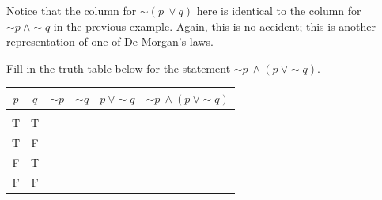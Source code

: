 Notice that the column for $\sim (p\ \vee q)$ here is identical to the column for $\sim p\ \wedge \sim q$ in the previous example.  Again, this is no accident; this is another representation of one of De Morgan's laws.

\begin{try}
Fill in the truth table below for the statement $\sim p\ \wedge (p\ \vee \sim q)$.
\begin{center}
\begin{tabular}{|c c c c c c|}
\hline
$p$ & $q$ & $\sim p$ & $\sim q$ & $p\ \vee \sim q$ & $\sim p\ \wedge (p\ \vee \sim q)$\\
\hline
& & & & &\\
T & T & & & &\\
T & F & & & &\\
F & T & & & &\\
F & F & & & &\\
\hline
\end{tabular}
\end{center}
\end{try}

